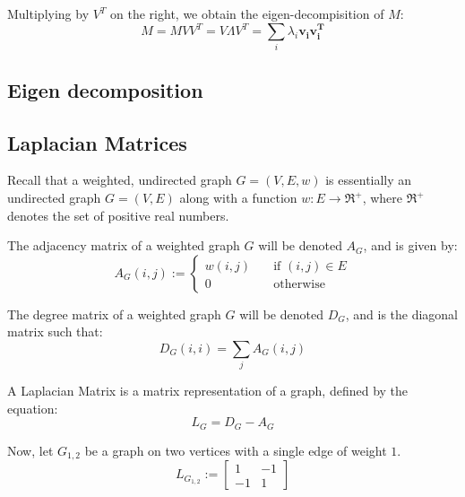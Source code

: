 Multiplying by $V^{T}$ on the right, we obtain the eigen-decompisition of $M$:
\begin{displaymath}
M = MVV^{T} = V{\Lambda}V^{T} = \sum_{i} \lambda_{i}\mathbf{v_{i}}\mathbf{v_{i}^{T}}
\end{displaymath}

\subsection{Eigen decomposition}
\label{sec:vectorsAndMatrices:eigenDecomposition}

\subsection{Laplacian Matrices}
\label{sec:vectorsAndMatrices:laplacianMatrices}
\nocite{BERKEYLEY99}
\nocite{PATI11}
\nocite{SPIELMAN09}
Recall that a weighted, undirected graph $G = (V,E,w)$ is essentially an 
undirected graph $G = (V,E)$ along with a function $w : E \rightarrow 
\Re^{+}$, where $\Re^{+}$ denotes the set of positive real numbers.

The adjacency matrix of a weighted graph $G$ will be denoted $A_{G}$, and is
given by:
\begin{displaymath}
A_{G}(i,j) := 
    \left\{
        \begin{array}{ll}
            \mathit{w}(i,j) &   \quad \text{if $(i,j) \in E$} \\
            0 &                 \quad \text{otherwise}
        \end{array}
    \right.
\end{displaymath}

The degree matrix of a weighted graph $G$ will be denoted $D_{G}$, and is the
diagonal matrix such that:
\begin{displaymath}
D_{G}(i,i) = \sum_{j} A_{G}(i,j)
\end{displaymath}

A Laplacian Matrix is a matrix representation of a graph, defined by the
equation:
\begin{displaymath}
L_{G} = D_{G} - A_{G}
\end{displaymath}

Now, let $G_{1,2}$ be a graph on two vertices with a single edge of weight $1$.
\begin{displaymath}
L_{G_{1,2}} :=
    \begin{bmatrix}
        1 & -1 \\
        -1 & 1
    \end{bmatrix}
\end{displaymath}

